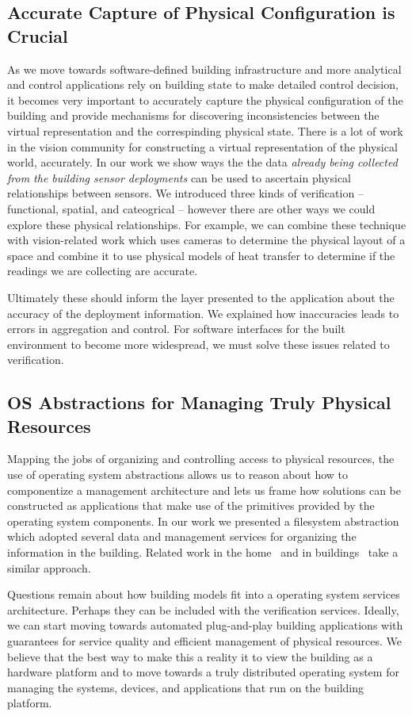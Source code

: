 \subsection{Accurate Capture of Physical Configuration is Crucial}
As we move towards software-defined building infrastructure and more analytical and control applications rely on building 
state to make detailed control decision, it becomes very important to accurately capture the physical configuration of the building
and provide mechanisms for discovering inconsistencies between the virtual representation and the correspinding physical state.
There is a lot of work in the vision community for constructing a virtual representation of the physical world, accurately.
In our work we show ways the the data \emph{already being collected from the building sensor deployments} can be used to
ascertain physical relationships between sensors.  We introduced three kinds of verification -- functional, spatial, and cateogrical --
however there are other ways we could explore these physical relationships.  For example, we can combine 
these technique with vision-related work which uses cameras to determine the physical layout of a space and combine
it to use physical models of heat transfer to determine if the readings we are collecting are accurate.

Ultimately these should inform the layer presented to the application about the accuracy of the deployment information.  We
explained how inaccuracies leads to errors in aggregation and control.  For software interfaces for the built environment
to become more widespread, we must solve these issues related to verification.


\subsection{OS Abstractions for Managing Truly Physical Resources}
Mapping the jobs of organizing and controlling access to physical resources, the use of operating system abstractions
allows us to reason about how to componentize a management architecture and lets us frame how solutions can 
be constructed as applications that make use of the primitives provided by the operating system components.
In our work we presented a filesystem abstraction which adopted several data and management services for organizing
the information in the building.  Related work in the home~\cite{homeos} and in buildings~\cite{boss} take a similar
approach.

Questions remain about how building models fit into a operating system services architecture.  Perhaps they can be
included with the verification services.  Ideally, we can start moving towards automated plug-and-play building applications
with guarantees for service quality and efficient management of physical resources.  We believe that the best way to
make this a reality it to view the building as a hardware platform and to move towards a truly distributed operating system
for managing the systems, devices, and applications that run on the building platform.



